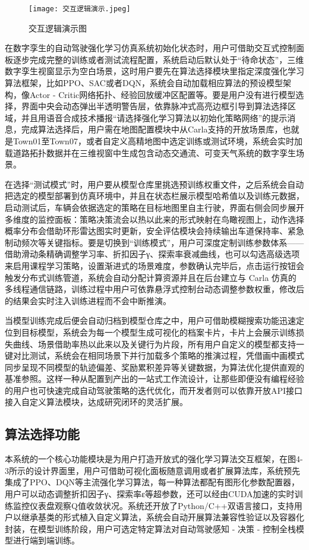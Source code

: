 \begin{figure}[hbt]
	\centering
	\texttt{[image: 交互逻辑演示.jpeg]}
	\caption{交互逻辑演示图}
	\label{f.example}
\end{figure}

在数字孪生的自动驾驶强化学习仿真系统初始化状态时，用户可借助交互式控制面板逐步完成完整的训练或者测试流程配置，系统启动后默认处于“待命状态”，三维数字孪生视窗显示为空白场景，这时用户要先在算法选择模块里指定深度强化学习算法框架，比如PPO、SAC或者DQN，系统会自动加载相应算法的预设模型架构，像Actor - Critic网络拓扑、经验回放缓冲区配置等。要是用户没有进行模型选择，界面中央会动态弹出半透明警告层，依靠脉冲式高亮边框引导到算法选择区域，并且用语音合成技术播报“请选择强化学习算法以初始化策略网络”的提示消息，完成算法选择后，用户需在地图配置模块中从Carla支持的开放场景库，也就是Town01至Town07，或者自定义高精地图中选定训练或测试环境，系统会实时加载道路拓扑数据并在三维视窗中生成包含动态交通流、可变天气系统的数字孪生场景。

在选择“测试模式”时，用户要从模型仓库里挑选预训练权重文件，之后系统会自动把选定的模型部署到仿真环境中，并且在状态栏展示模型哈希值以及训练元数据，启动测试后，车辆会依据选定的策略在目标地图里自主行驶，界面右侧会同步展开多维度的监控面板：策略决策流会以热以此来的形式映射在鸟瞰视图上，动作选择概率分布会借助环形雷达图实时更新，安全评估模块会持续输出车道保持率、紧急制动频次等关键指标。要是切换到“训练模式”，用户可深度定制训练参数体系——借助滑动条精确调整学习率、折扣因子γ、探索率衰减曲线，也可以勾选高级选项来启用课程学习策略，设置渐进式的场景难度，参数确认完毕后，点击运行按钮会触发分布式训练管道，系统会自动分配计算资源并且在后台建立与 Carla 仿真的多线程通信链路，训练过程中用户可依靠悬浮式控制台动态调整参数权重，修改后的结果会实时注入训练进程而不会中断推演。

当模型训练完成后便会自动归档到模型仓库之中，用户可借助模糊搜索功能迅速定位到目标模型，系统会为每一个模型生成可视化的档案卡片，卡片上会展示训练损失曲线、场景借助率热以此来以及关键行为片段，所有用户自定义的模型都支持一键对比测试，系统会在相同场景下并行加载多个策略的推演过程，凭借画中画模式同步呈现不同模型的轨迹偏差、奖励累积差异等关键数据，为算法优化提供直观的基准参照。这样一种从配置到产出的一站式工作流设计，让那些即便没有编程经验的用户也可快速完成自动驾驶策略的迭代优化，而开发者则可以依靠开放API接口接入自定义算法模块，达成研究闭环的灵活扩展。
\subsection{算法选择功能}
本系统的一个核心功能模块是为用户打造开放式的强化学习算法交互框架，在图4-3所示的设计界面里，用户可借助可视化面板随意调用或者扩展算法库，系统预先集成了PPO、DQN等主流强化学习算法，每一种算法都配有图形化参数配置器，用户可以动态调整折扣因子γ、探索率ε等超参数，还可以经由CUDA加速的实时训练监控仪表盘观察Q值收敛状况。系统还开放了Python/C++双语言接口，支持用户以继承基类的形式植入自定义算法，系统会自动开展算法兼容性验证以及容器化封装，在模型训练阶段，用户可选定特定算法对自动驾驶感知 - 决策 - 控制全栈模型进行端到端训练。

